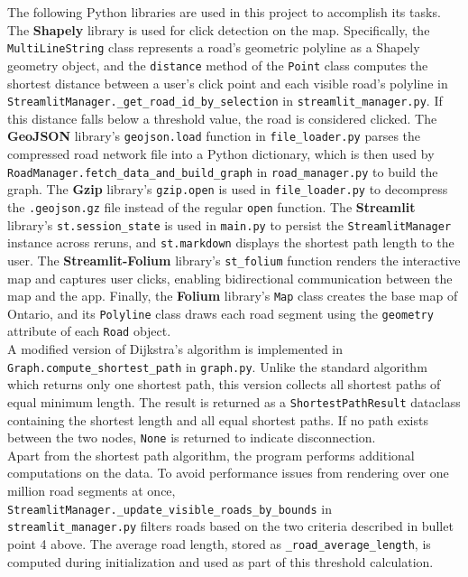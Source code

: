 \documentclass[fontsize=11pt]{article}
\begin{document}
The following Python libraries are used in this project to accomplish its tasks. The \textbf{Shapely} library is used for click detection on the map. Specifically, the \texttt{MultiLineString} class represents a road's geometric polyline as a Shapely geometry object, and the \texttt{distance} method of the \texttt{Point} class computes the shortest distance between a user's click point and each visible road's polyline in \texttt{StreamlitManager.\_get\_road\_id\_by\_selection} in \texttt{streamlit\_manager.py}. If this distance falls below a threshold value, the road is considered clicked. The \textbf{GeoJSON} library's \texttt{geojson.load} function in \texttt{file\_loader.py} parses the compressed road network file into a Python dictionary, which is then used by \texttt{RoadManager.fetch\_data\_and\_build\_graph} in \texttt{road\_manager.py} to build the graph. The \textbf{Gzip} library's \texttt{gzip.open} is used in \texttt{file\_loader.py} to decompress the \texttt{.geojson.gz} file instead of the regular \texttt{open} function. The \textbf{Streamlit} library's \texttt{st.session\_state} is used in \texttt{main.py} to persist the \texttt{StreamlitManager} instance across reruns, and \texttt{st.markdown} displays the shortest path length to the user. The \textbf{Streamlit-Folium} library's \texttt{st\_folium} function renders the interactive map and captures user clicks, enabling bidirectional communication between the map and the app. Finally, the \textbf{Folium} library's \texttt{Map} class creates the base map of Ontario, and its \texttt{Polyline} class draws each road segment using the \texttt{geometry} attribute of each \texttt{Road} object. \\

A modified version of Dijkstra's algorithm is implemented in \texttt{Graph.compute\_shortest\_path} in \texttt{graph.py}. Unlike the standard algorithm which returns only one shortest path, this version collects all shortest paths of equal minimum length. The result is returned as a \texttt{ShortestPathResult} dataclass containing the shortest length and all equal shortest paths. If no path exists between the two nodes, \texttt{None} is returned to indicate disconnection. \\

Apart from the shortest path algorithm, the program performs additional computations on the data. To avoid performance issues from rendering over one million road segments at once, \texttt{StreamlitManager.\_update\_visible\_roads\_by\_bounds} in \texttt{streamlit\_manager.py} filters roads based on the two criteria described in bullet point 4 above. The average road length, stored as \texttt{\_road\_average\_length}, is computed during initialization and used as part of this threshold calculation.
\end{document}
